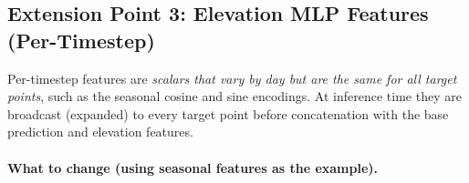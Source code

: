 \subsection{Extension Point 3: Elevation MLP Features (Per-Timestep)}

Per-timestep features are \emph{scalars that vary by day but are the same for all target points}, such as the seasonal cosine and sine encodings.
At inference time they are broadcast (expanded) to every target point before concatenation with the base prediction and elevation features.

\paragraph{What to change (using seasonal features as the example).}

